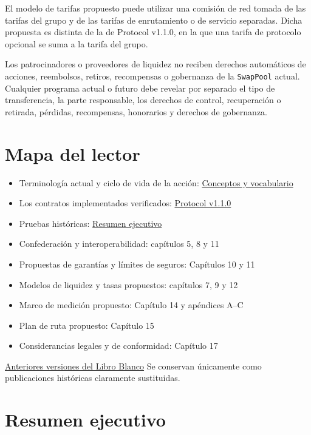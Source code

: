 \documentclass[11pt]{article}
\begin{document}
El modelo de tarifas propuesto puede utilizar una comisión de red tomada de las tarifas del grupo y de las tarifas de enrutamiento o de servicio separadas. Dicha propuesta es distinta de la de Protocol v1.1.0, en la que una tarifa de protocolo opcional se suma a la tarifa del grupo.

Los patrocinadores o proveedores de liquidez no reciben derechos automáticos de acciones, reembolsos, retiros, recompensas o gobernanza de la \texttt{SwapPool} actual. Cualquier programa actual o futuro debe revelar por separado el tipo de transferencia, la parte responsable, los derechos de control, recuperación o retirada, pérdidas, recompensas, honorarios y derechos de gobernanza.

\section*{Mapa del lector}

\begin{itemize}[leftmargin=*]
\item Terminología actual y ciclo de vida de la acción: \href{https://docs.cosmolocal.credit/es/introduction/concepts}{Conceptos y vocabulario}
\item Los contratos implementados verificados: \href{https://docs.cosmolocal.credit/es/protocol/overview}{Protocol v1.1.0}
\item Pruebas históricas: \href{https://docs.cosmolocal.credit/es/white-paper/executive-summary}{Resumen ejecutivo}
\item Confederación y interoperabilidad: capítulos 5, 8 y 11
\item Propuestas de garantías y límites de seguros: Capítulos 10 y 11
\item Modelos de liquidez y tasas propuestos: capítulos 7, 9 y 12
\item Marco de medición propuesto: Capítulo 14 y apéndices A--C
\item Plan de ruta propuesto: Capítulo 15
\item Considerancias legales y de conformidad: Capítulo 17
\end{itemize}
\href{https://docs.cosmolocal.credit/es/white-paper/archive}{Anteriores versiones del Libro Blanco} Se conservan únicamente como publicaciones históricas claramente sustituidas.

\section*{Resumen ejecutivo}
\end{document}
